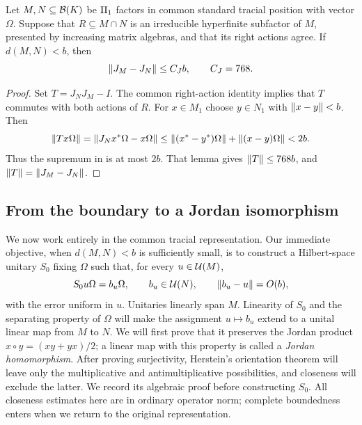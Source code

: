 \begin{lemma}
\label{lem:tracial-conjugations}
Let $M,N\subseteq\mathcal B(K)$ be $\mathrm{II}_1$ factors in common standard tracial
position with vector $\Omega$.  Suppose that $R\subseteq M\cap N$ is
an irreducible hyperfinite subfactor of $M$, presented by increasing
matrix algebras, and that its right actions agree.  If $d(M,N)<b$, then
\[
 \lVert J_M-J_N\rVert\le C_Jb,\qquad C_J=768.
\]
\end{lemma}
\begin{proof}
Set $T=J_NJ_M-I$.  The common right-action identity implies that $T$
commutes with both actions of $R$.  For $x\in M_1$ choose $y\in N_1$
with $\lVert x-y\rVert<b$.  Then
\[
 \lVert Tx\Omega\rVert
 =\lVert J_Nx^*\Omega-x\Omega\rVert
 \le\lVert(x^*-y^*)\Omega\rVert+\lVert(x-y)\Omega\rVert<2b.
\]
Thus the supremum in  is at most $2b$.
That lemma gives $\lVert T\rVert\le768b$, and
$\lVert T\rVert=\lVert J_M-J_N\rVert$.
\end{proof}

\subsection{From the boundary to a Jordan isomorphism}

We now work entirely in the common tracial representation.  Our immediate
objective, when $d(M,N)<b$ is sufficiently small, is to construct a
Hilbert-space unitary $S_0$ fixing $\Omega$ such that, for every
$u\in\mathcal U(M)$,
\[
 S_0u\Omega=b_u\Omega,\qquad b_u\in\mathcal U(N),\qquad
 \lVert b_u-u\rVert=O(b),
\]
with the error uniform in $u$.  Unitaries linearly span $M$.  Linearity
of $S_0$ and the separating property of $\Omega$ will make the assignment
$u\mapsto b_u$ extend to a unital linear map from $M$ to $N$.
We will first prove that it preserves the Jordan product
$x\circ y=(xy+yx)/2$; a linear map with this property is called a
\emph{Jordan homomorphism}.  After proving surjectivity, Herstein's
orientation theorem \cite{Herstein1956} will leave only the multiplicative
and antimultiplicative possibilities, and closeness will exclude the
latter.  We record its algebraic proof before constructing $S_0$.
All closeness estimates here are in ordinary operator norm; complete
boundedness enters when we return to the original representation.

